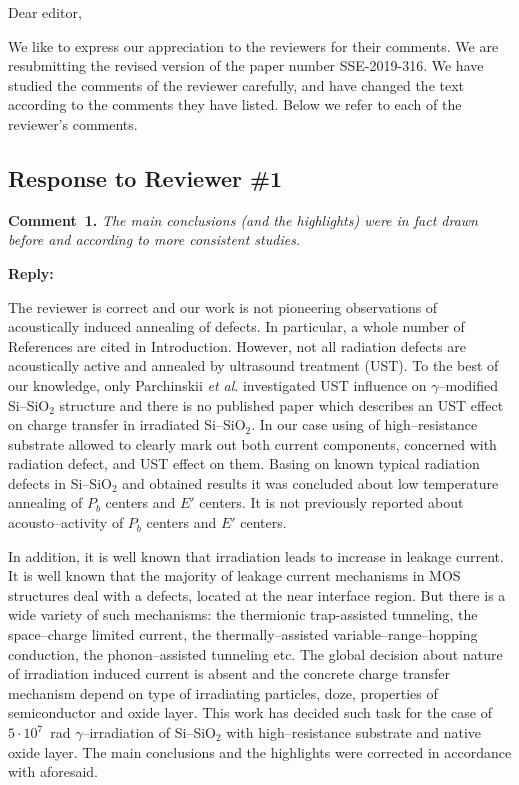 \documentclass[aip,jap,preprint]{revtex4-1}
\begin{document}
Dear editor,

We like to express our appreciation to the reviewers for their comments.
We are resubmitting the revised version of the paper number  SSE-2019-316.
We have studied the comments of the reviewer carefully, and have changed the text according to the comments they
have listed.
Below we refer to each of the reviewer’s comments.



\subsection*{Response to Reviewer \#1 }

\noindent
\textcolor[rgb]{0.00,0.50,1.00}{\textbf{Comment~1.}}
\emph{The main conclusions (and the highlights) were in fact drawn before and according to more consistent studies.}

\noindent
\textcolor[rgb]{0.51,0.00,0.00}{\textbf{Reply:}}

The reviewer is correct and our work is not pioneering observations of acoustically induced annealing of defects.
In particular, a whole number of References are cited in Introduction.
However, not all radiation defects are acoustically active and annealed by ultrasound treatment (UST).
To the best of our knowledge, only Parchinskii \emph{et al}. \cite{Parchinskii2000,Parchinskii2006} investigated UST influence on
$\gamma$--modified Si--SiO$_2$ structure and there is no published paper which describes an UST effect on charge transfer in irradiated Si--SiO$_2$.
In our case using of high--resistance substrate allowed to clearly mark out both current components, concerned with radiation defect, and UST effect on them.
Basing on known typical radiation defects in Si--SiO$_2$ and obtained results it was concluded about low temperature annealing of $P_b$ centers and $E'$ centers.
It is not previously reported about acousto--activity of  $P_b$ centers and $E'$ centers.

In addition, it is well known that irradiation leads to increase in leakage current.
It is well known that the majority of leakage current mechanisms in MOS structures
deal with a defects, located at the near interface region.
But there is a wide variety of such mechanisms:
the thermionic trap-assisted tunneling,
the space--charge limited current,
the thermally--assisted variable--range--hopping conduction,
the phonon--assisted tunneling etc.
The global decision about nature of irradiation induced current is absent
and the concrete charge transfer mechanism depend on type of irradiating particles, doze,  properties of semiconductor and oxide layer.
This work has decided such task for the case of $5\cdot10^7$~rad $\gamma$--irradiation of Si--SiO$_2$ with high--resistance substrate and native oxide layer.
The main conclusions and the highlights were corrected in accordance with aforesaid.
\end{document}
